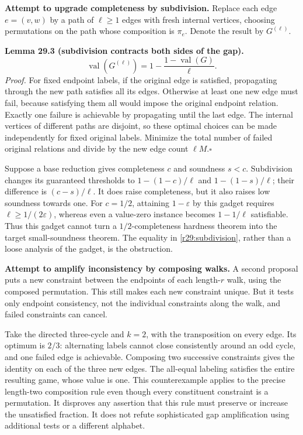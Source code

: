 \documentclass[11pt,a4paper]{article}
\numberwithin{equation}{section}
\begin{document}
\medskip
\textbf{Attempt to upgrade completeness by subdivision.}
Replace each edge $e=(v,w)$ by a path of $\ell\ge1$ edges with fresh
internal vertices, choosing permutations on the path whose composition
is $\pi_e$. Denote the result by $G^{(\ell)}$.

\textbf{Lemma 29.3 (subdivision contracts both sides of the gap).}
\begin{equation}\label{r29:subdivision}
 \operatorname{val}(G^{(\ell)})
          =1-\frac{1-\operatorname{val}(G)}{\ell}.
\end{equation}
\emph{Proof.} For fixed endpoint labels, if the original edge is satisfied,
propagating through the new path satisfies all its edges. Otherwise at
least one new edge must fail, because satisfying them all would impose
the original endpoint relation. Exactly one failure is achievable by
propagating until the last edge. The internal vertices of different paths
are disjoint, so these optimal choices can be made independently for
fixed original labels. Minimize the total number of failed original
relations and divide by the new edge count $\ell M$.\hfill$\square$

Suppose a base reduction gives completeness $c$ and soundness $s<c$.
Subdivision changes its guaranteed thresholds to
$1-(1-c)/\ell$ and $1-(1-s)/\ell$; their difference is $(c-s)/\ell$.
It does raise completeness, but it also raises low soundness towards one.
For $c=1/2$, attaining $1-\varepsilon$ by this gadget requires
$\ell\ge1/(2\varepsilon)$, whereas even a value-zero instance becomes
$1-1/\ell$ satisfiable. Thus this gadget cannot turn a $1/2$-completeness
hardness theorem into the target small-soundness theorem. The equality
in \eqref{r29:subdivision}, rather than a loose analysis of the gadget,
is the obstruction.

\medskip
\textbf{Attempt to amplify inconsistency by composing walks.}
A second proposal puts a new constraint between the endpoints of each
length-$r$ walk, using the composed permutation. This still makes each
new constraint unique. But it tests only endpoint consistency, not the
individual constraints along the walk, and failed constraints can cancel.

Take the directed three-cycle and $k=2$, with the transposition on every
edge. Its optimum is $2/3$: alternating labels cannot close consistently
around an odd cycle, and one failed edge is achievable. Composing two
successive constraints gives the identity on each of the three new edges.
The all-equal labeling satisfies the entire resulting game, whose value
is one. This counterexample applies to the precise length-two composition
rule even though every constituent constraint is a permutation.
It disproves any assertion that this rule must preserve or increase the
unsatisfied fraction. It does not refute sophisticated gap amplification
using additional tests or a different alphabet.
\end{document}
